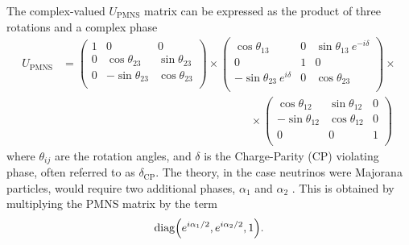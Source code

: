 The complex-valued $U_\mathrm{PMNS}$ matrix can be expressed as the product of three rotations and a complex phase \begin{equation}
    \begin{aligned}
        U_\mathrm{PMNS} &= \begin{pmatrix}
            1 & 0 & 0\\
            0 & \cos\theta_{23} & \sin\theta_{23} \\
            0 & -\sin\theta_{23} & \cos\theta_{23} \\
        \end{pmatrix} \times \begin{pmatrix}
            \cos\theta_{13} & 0 & \sin\theta_{13}\ e^{-i\delta} \\
            0 & 1 & 0\\
            -\sin\theta_{23}\ e^{i\delta} & 0 & \cos\theta_{23} \\
        \end{pmatrix} \times\\ 
        &\hspace{7cm}\times \begin{pmatrix}
            \cos\theta_{12} & \sin\theta_{12} & 0\\
            -\sin\theta_{12} & \cos\theta_{12} & 0\\
            0 & 0 & 1\\
        \end{pmatrix}
    \end{aligned} \label{eq:PMNS}
\end{equation} where $\theta_{ij}$ are the rotation angles, and $\delta$ is the Charge-Parity (CP) violating phase, often referred to as $\delta_\mathrm{CP}$. The theory, in the case neutrinos were Majorana particles, would require two additional phases, $\alpha_1$ and $\alpha_2$ \cite{zuberNeutrinoPhysics2020}. This is obtained by multiplying the PMNS matrix by the term \begin{equation}
    \mathrm{diag}\qty(e^{i\alpha_1/2}, e^{i\alpha_2/2}, 1).
\end{equation}

